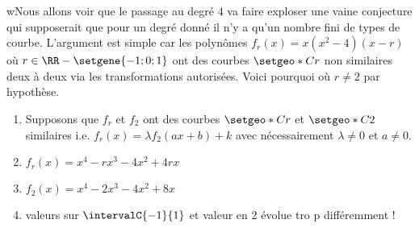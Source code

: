 wNous allons voir que le passage au degré $4$ va faire exploser une vaine conjecture qui supposerait que pour un degré donné il n'y a qu'un nombre fini de types de courbe.
L'argument est simple car les polynômes $f_r(x) = x (x^2 - 4) (x - r)$ où $r \in \RR - \setgene{-1 ; 0 ; 1}$ ont des courbes $\setgeo*{C}{r}$ non similaires deux à deux via les transformations autorisées. Voici pourquoi où $r \neq 2$ par hypothèse.

\begin{enumerate}
	\item Supposons que $f_r$ et $f_2$ ont des courbes $\setgeo*{C}{r}$ et $\setgeo*{C}{2}$ similaires i.e. $f_r(x) = \lambda f_2(a x + b) + k$ avec nécessairement $\lambda \neq 0$ et $a \neq 0$.


	\item $f_r(x) = x^4 - r x^3 - 4 x^2 + 4 r x$


	\item $f_2(x) = x^4 - 2 x^3 - 4 x^2 + 8 x$


	\item valeurs sur $\intervalC{-1}{1}$ et valeur en 2 évolue tro p différemment !
\end{enumerate}
